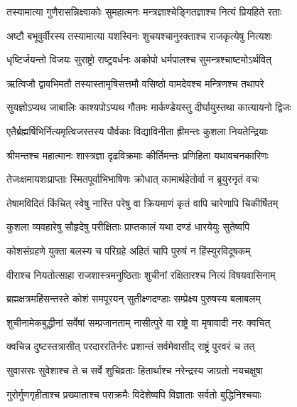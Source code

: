 
\twolineshloka
{तस्यामात्या गुणैरासन्निक्ष्वाकोः सुमहात्मनः}
{मन्त्रज्ञाश्चेङ्गितज्ञाश्च नित्यं प्रियहिते रताः} %

\twolineshloka
{अष्टौ बभूवुर्वीरस्य तस्यामात्या यशस्विनः}
{शुचयश्चानुरक्ताश्च राजकृत्येषु नित्यशः} %

\twolineshloka
{धृष्टिर्जयन्तो विजयः सुराष्ट्रो राष्ट्र्वर्धनः}
{अकोपो धर्मपालश्च सुमन्त्रश्चाष्टमोऽर्थवित्} %

\twolineshloka
{ऋत्विजौ द्वावभिमतौ तस्यास्तामृषिसत्तमौ}
{वसिष्ठो वामदेवश्च मन्त्रिणश्च तथापरे} %

\twolineshloka
{सुयज्ञोऽप्यथ जाबालिः काश्यपोऽप्यथ गौतमः}
{मार्कण्डेयस्तु दीर्घायुस्तथा कात्यायनो द्विजः} %

\twolineshloka
{एतैर्ब्रह्मर्षिभिर्नित्यमृत्विजस्तस्य पौर्वकाः}
{विद्याविनीता ह्रीमन्तः कुशला नियतेन्द्रियाः} %

\twolineshloka
{श्रीमन्तश्च महात्मानः शास्त्रज्ञा दृढविक्रमाः}
{कीर्तिमन्तः प्रणिहिता यथावचनकारिणः} %

\twolineshloka
{तेजःक्षमायशःप्राप्ताः स्मितपूर्वाभिभाषिणः}
{क्रोधात् कामार्थहेतोर्वा न ब्रूयुरनृतं वचः} %

\twolineshloka
{तेषामविदितं किंचित् स्वेषु नास्ति परेषु वा}
{क्रियमाणं कृतं वापि चारेणापि चिकीर्षितम्} %

\twolineshloka
{कुशला व्यवहारेषु सौहृदेषु परीक्षिताः}
{प्राप्तकालं यथा दण्डं धारयेयुः सुतेष्वपि} %

\twolineshloka
{कोशसंग्रहणे युक्ता बलस्य च परिग्रहे}
{अहितं चापि पुरुषं न हिंस्युरविदूषकम्} %

\twolineshloka
{वीराश्च नियतोत्साहा राजशास्त्रमनुष्ठिताः}
{शुचीनां रक्षितारश्च नित्यं विषयवासिनाम्} %

\twolineshloka
{ब्रह्मक्षत्रमहिंसन्तस्ते कोशं समपूरयन्}
{सुतीक्ष्णदण्डाः सम्प्रेक्ष्य पुरुषस्य बलाबलम्} %

\twolineshloka
{शुचीनामेकबुद्धीनां सर्वेषां सम्प्रजानताम्}
{नासीत्पुरे वा राष्ट्रे वा मृषावादी नरः क्वचित्} %

\twolineshloka
{क्वचिन्न दुष्टस्तत्रासीत् परदाररतिर्नरः}
{प्रशान्तं सर्वमेवासीद् राष्ट्रं पुरवरं च तत्} %

\twolineshloka
{सुवाससः सुवेशाश्च ते च सर्वे शुचिव्रताः}
{हितार्थाश्च नरेन्द्रस्य जाग्रतो नयचक्षुषा} %

\twolineshloka
{गुरोर्गुणगृहीताश्च प्रख्याताश्च पराक्रमैः}
{विदेशेष्वपि विज्ञाताः सर्वतो बुद्धिनिश्चयाः} %

